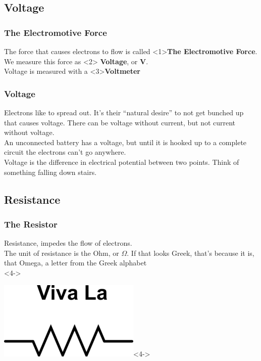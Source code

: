 \documentclass[10pt, handout]{beamer}
\begin{document}
\subsection{Voltage}

\begin{frame}
\frametitle{The Electromotive Force}
The force that causes electrons to flow is called \only{\ldots}<1>\pause \textbf{The Electromotive Force}.\\
 We measure this force as \only{\ldots}<2>\pause\textbf{ Voltage}, or \textbf{V}.\\
Voltage is measured with a \only{\ldots}<3>\pause \textbf{Voltmeter}
\end{frame}

\begin{frame}
\frametitle{Voltage}
Electrons like to spread out. It's their ``natural desire'' to not get bunched up that causes voltage. There can be voltage without current, but not current without voltage.\\
An unconnected battery has a voltage, but until it is hooked up to a complete circuit the electrons can't go anywhere.\\
Voltage is the difference in electrical potential between two points. Think of something falling down stairs.
\end{frame}

\subsection{Resistance}

\begin{frame}
\frametitle{The Resistor}
Resistance, impedes the flow of electrons.\\
The unit of resistance is the Ohm, or $\Omega$. \pause If that looks Greek, that's because it is, that Omega, a letter from the Greek alphabet\\  <4->
\begin{center}
\includegraphics[width=.25\textwidth]{viva.png}<4->
\end{center}
\end{frame}
\end{document}
